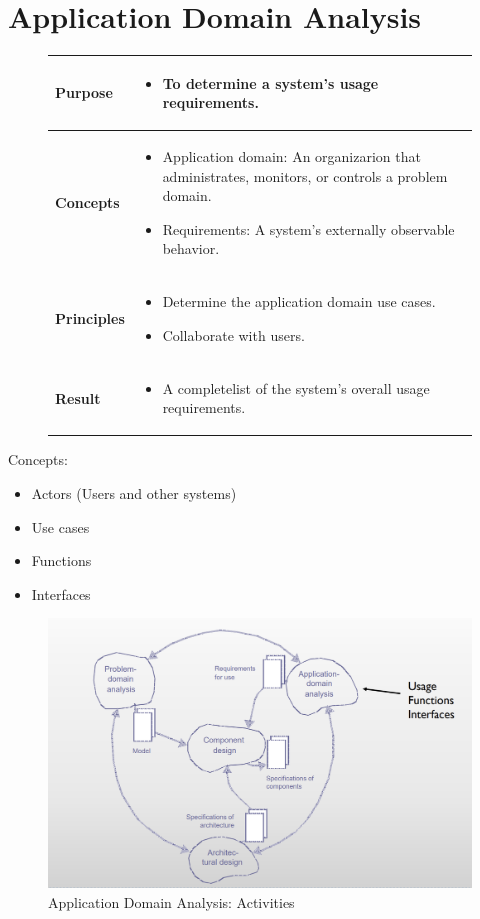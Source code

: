 \part{Application Domain Analysis}
\begin{figure}[H]
    \begin{tabular}{|l|p{12cm}|}
        \hline
        \textbf{Purpose} & \begin{itemize}
            \item To determine a system's usage requirements.
        \end{itemize} \\\hline
        \textbf{Concepts} & \begin{itemize}
            \item Application domain: An organizarion that administrates, monitors, or controls a problem domain.
            \item Requirements: A system's externally observable behavior.
        \end{itemize} \\\hline
        \textbf{Principles} & \begin{itemize}
            \item Determine the application domain use cases.
            \item Collaborate with users.
        \end{itemize} \\\hline
        \textbf{Result} & \begin{itemize}
            \item A completelist of the system's overall usage requirements.
        \end{itemize} \\\hline
    \end{tabular}
\end{figure}
Concepts:
\begin{itemize}
    \item Actors (Users and other systems)
    \item Use cases
    \item Functions
    \item Interfaces
\end{itemize}
\begin{figure}[]
    \centering
    \includegraphics[width=\linewidth]{parts/3_application_domain_analysis/figures/activities.png}
    \caption{Application Domain Analysis: Activities}
\end{figure}

